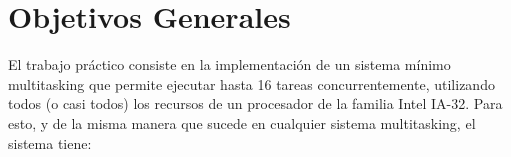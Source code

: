 \documentclass[a4paper,10pt]{article}
\begin{document}
\thispagestyle{empty}

\maketitle
\newpage

\section{Objetivos Generales}
El trabajo práctico consiste en la implementación de un sistema mínimo multitasking que permite ejecutar hasta 16 tareas concurrentemente, utilizando todos (o casi todos) los recursos de un procesador de la familia Intel IA-32. Para esto, y de la misma manera que sucede en cualquier sistema multitasking, el sistema tiene:
\end{document}
